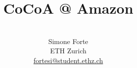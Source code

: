 \documentclass[11pt, a4paper, reqno, twoside]{scrartcl}
\begin{document}
\pagestyle{fancy}

\title{CoCoA @ Amazon}

\author{\\ Simone Forte\\
{\small ETH Zurich}\\
{\small \href{mailto:fortesi@student.ethz.ch}{fortesi@student.ethz.ch}}}
\date{}

\maketitle


%
%
%

{}

\end{document}
